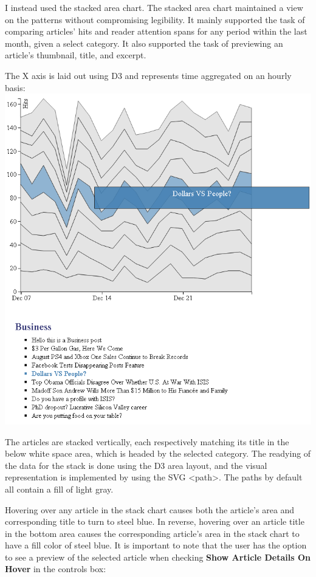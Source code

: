 \documentclass[12pt]{article}
\begin{document}
{\noindent I instead used the stacked area chart. The stacked area chart maintained a view on the patterns without compromising legibility. It mainly supported the task of comparing articles' hits and reader attention spans for any period within the last month, given a select category. It also supported the task of previewing an article's thumbnail, title, and excerpt.

\newpage

\noindent The X axis is laid out using D3 and represents time aggregated on an hourly basis: \\

\noindent\includegraphics[scale=0.8]{img/viz_1}

The articles are stacked vertically, each respectively matching its title in the below white space area, which is headed by the selected category. The readying of the data for the stack is done using the D3 area layout, and the visual representation is implemented by using the SVG <path>. The paths by default all contain a fill of light gray. 

Hovering over any article in the stack chart causes both the article's area and corresponding title to turn to steel blue. In reverse, hovering over an article title in the bottom area causes the corresponding article's area in the stack chart to have a fill color of steel blue. 
It is important to note that the user has the option to see a preview of the selected article when checking \textbf{Show Article Details On Hover} in the controls box:

}
\end{document}
